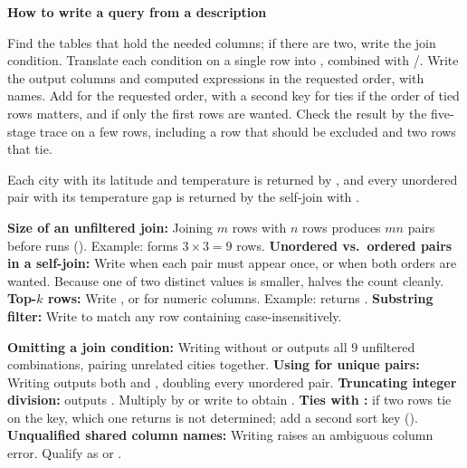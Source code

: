 \documentclass[10pt]{scrartcl}
\newenvironment{howto}[1]{\begin{mdframed}[style=howtostyle]{\color{NavyBlue}\textbf{#1}}\par\vspace{2pt}}{\end{mdframed}}
\begin{document}
\begin{howto}{How to write a  query from a description}
\begin{steps}
  \ii Find the tables that hold the needed columns; if there are two, write the join condition.
  \ii Translate each condition on a single row into , combined with /.
  \ii Write the output columns and computed expressions in the requested order, with  names.
  \ii Add  for the requested order, with a second key for ties if the order of tied rows matters, and  if only the first rows are wanted.
  \ii Check the result by the five-stage trace on a few rows, including a row that should be excluded and two rows that tie.
\end{steps}
\end{howto}

\revisit Each city with its latitude and temperature is returned by , and every unordered pair with its temperature gap is returned by the self-join with .

\begin{shortcuts}
  \ii \textbf{Size of an unfiltered join:} Joining $m$ rows with $n$ rows produces $mn$ pairs before  runs (). Example:  forms $3 \times 3 = 9$ rows.
  \ii \textbf{Unordered vs.\ ordered pairs in a self-join:} Write  when each pair must appear once, or  when both orders are wanted. Because one of two distinct values is smaller,  halves the count cleanly.
  \ii \textbf{Top-$k$ rows:} Write , or  for numeric columns. Example:  returns .
  \ii \textbf{Substring filter:} Write  to match any row containing  case-insensitively.
\end{shortcuts}

\begin{trapbox}
  \ii \textbf{Omitting a join condition:} Writing  without  or  outputs all $9$ unfiltered combinations, pairing unrelated cities together.
  \ii \textbf{Using \cd{!=} for unique pairs:} Writing  outputs both  and , doubling every unordered pair.
  \ii \textbf{Truncating integer division:}  outputs . Multiply by  or write  to obtain .
  \ii \textbf{Ties with :} if two rows tie on the  key, which one  returns is not determined; add a second sort key ().
  \ii \textbf{Unqualified shared column names:} Writing  raises an ambiguous column error. Qualify as  or .
\end{trapbox}
\end{document}
